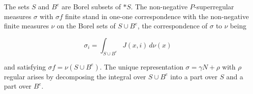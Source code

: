 The sets $S$ and $B^e$ are Borel subsets of $*S$. The non-negative $P$-superregular measures $\sigma$ with $\sigma f$ finite stand in one-one correspondence with the non-negative finite measures $\nu$ on the Borel sets of $S \cup B^e$, the correspondence of $\sigma$ to $\nu$ being

$$\sigma_i = \int_{S \cup B^e} J(x, i)\,d\nu(x)$$

and satisfying $\sigma f = \nu(S \cup B^e)$. The unique representation $\sigma = \gamma N + \rho$ with $\rho$ regular arises by decomposing the integral over $S \cup B^e$ into a part over $S$ and a part over $B^e$.
